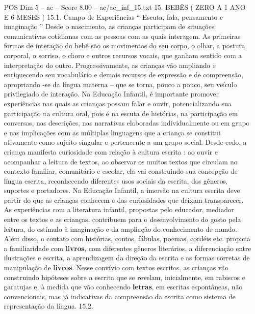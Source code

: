 \begin{textsample}{POS Dim 5 – ac – Score 8.00 – ac/ac\_inf\_15.txt}  \label{ex:f5_pos_122}
15.
BEBÊS ( ZERO A 1 ANO E 6 MESES ) 15.1.
Campo de Experiências “ Escuta, fala, pensamento e imaginação ” Desde o nascimento, as crianças participam de situações comunicativas cotidianas com as pessoas com as quais interagem.
As primeiras formas de interação do bebê são os movimentos do seu corpo, o olhar, a postura corporal, o sorriso, o choro e outros recursos vocais, que ganham sentido com a interpretação do outro.
Progressivamente, as crianças vão ampliando e enriquecendo seu vocabulário e demais recursos de expressão e de compreensão, apropriando -se da língua materna – que se torna, pouco a pouco, seu veículo privilegiado de interação.
Na Educação Infantil, é importante promover experiências nas quais as crianças possam falar e ouvir, potencializando sua participação na cultura oral, pois é na escuta de histórias, na participação em conversas, nas descrições, nas narrativas elaboradas individualmente ou em grupo e nas implicações com as múltiplas linguagens que a criança se constitui ativamente como sujeito singular e pertencente a um grupo social.
Desde cedo, a criança manifesta curiosidade com relação à cultura escrita : ao ouvir e acompanhar a leitura de textos, ao observar os muitos textos que circulam no contexto familiar, comunitário e escolar, ela vai construindo sua concepção de língua escrita, reconhecendo diferentes usos sociais da escrita, dos gêneros, suportes e portadores.
Na Educação Infantil, a imersão na cultura escrita deve partir do que as crianças conhecem e das curiosidades que deixam transparecer.
As experiências com a literatura infantil, propostas pelo educador, mediador entre os textos e as crianças, contribuem para o desenvolvimento do gosto pela leitura, do estímulo à imaginação e da ampliação do conhecimento de mundo.
Além disso, o contato com histórias, contos, fábulas, poemas, cordéis etc. propicia a familiaridade com \textbf{livros}, com diferentes gêneros literários, a diferenciação entre ilustrações e escrita, a aprendizagem da direção da escrita e as formas corretas de manipulação de \textbf{livros}.
Nesse convívio com textos escritos, as crianças vão construindo hipóteses sobre a escrita que se revelam, inicialmente, em rabiscos e garatujas e, à medida que vão conhecendo \textbf{letras}, em escritas espontâneas, não convencionais, mas já indicativas da compreensão da escrita como sistema de representação da língua. 15.2.

\end{textsample}
